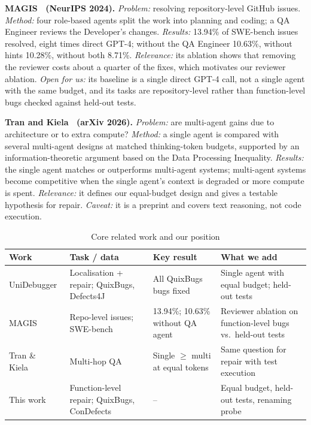 \documentclass[conference]{IEEEtran}
\begin{document}
\textbf{MAGIS~\cite{magis} (NeurIPS 2024).} \emph{Problem:} resolving
repository-level GitHub issues. \emph{Method:} four role-based agents split
the work into planning and coding; a QA Engineer reviews the Developer's
changes. \emph{Results:} 13.94\% of SWE-bench issues resolved, eight times
direct GPT-4; without the QA Engineer 10.63\%, without hints 10.28\%, without
both 8.71\%. \emph{Relevance:} its ablation shows that removing the reviewer
costs about a quarter of the fixes, which motivates our reviewer ablation.
\emph{Open for us:} its baseline is a single direct GPT-4 call, not a
single agent with the same budget, and its tasks are repository-level rather
than function-level bugs checked against held-out tests.

\textbf{Tran and Kiela~\cite{trankiela} (arXiv 2026).} \emph{Problem:} are
multi-agent gains due to architecture or to extra compute? \emph{Method:} a
single agent is compared with several multi-agent designs at matched
thinking-token budgets, supported by an information-theoretic argument based
on the Data Processing Inequality.
\emph{Results:} the single agent matches or outperforms multi-agent systems;
multi-agent systems become competitive when the single agent's context is
degraded or more compute is spent. \emph{Relevance:} it defines our
equal-budget design and gives a testable hypothesis for repair. \emph{Caveat:}
it is a preprint and covers text reasoning, not code execution.

\begin{table}[t]
\caption{Core related work and our position}
\label{tab:rw}
\centering
\footnotesize
\begin{tabular}{@{}>{\raggedright}p{1.25cm}>{\raggedright}p{1.55cm}>{\raggedright}p{1.65cm}>{\raggedright\arraybackslash}p{2.75cm}@{}}
\toprule
Work & Task / data & Key result & What we add \\
\midrule
UniDebugger~\cite{unidebugger} & Localisation + repair; QuixBugs, Defects4J & All QuixBugs bugs fixed & Single agent with equal budget; held-out tests \\
MAGIS~\cite{magis} & Repo-level issues; SWE-bench & 13.94\%; 10.63\% without QA agent & Reviewer ablation on function-level bugs vs.\ held-out tests \\
Tran \& Kiela~\cite{trankiela} & Multi-hop QA & Single $\geq$ multi at equal tokens & Same question for repair with test execution \\
\midrule
This work & Function-level repair; QuixBugs, ConDefects & -- & Equal budget, held-out tests, renaming probe \\
\bottomrule
\end{tabular}
\end{table}
\end{document}
